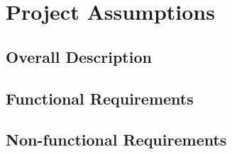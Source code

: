 \chapter{Project Assumptions}
\section{Overall Description}
\section{Functional Requirements}
\section{Non-functional Requirements}
    